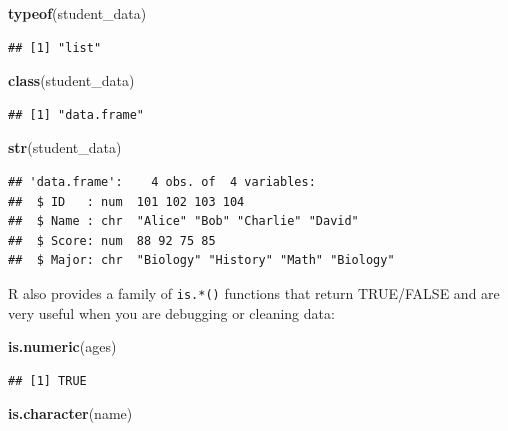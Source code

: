 \documentclass[
  11pt,
]{article}
\newenvironment{Shaded}{\begin{snugshade}}{\end{snugshade}}
\newcommand{\FunctionTok}[1]{\textcolor[rgb]{0.13,0.29,0.53}{\textbf{#1}}}
\newcommand{\NormalTok}[1]{#1}
\begin{document}
\begin{Shaded}
\begin{Highlighting}[]
\FunctionTok{typeof}\NormalTok{(student\_data)}
\end{Highlighting}
\end{Shaded}

\begin{verbatim}
## [1] "list"
\end{verbatim}

\begin{Shaded}
\begin{Highlighting}[]
\FunctionTok{class}\NormalTok{(student\_data)}
\end{Highlighting}
\end{Shaded}

\begin{verbatim}
## [1] "data.frame"
\end{verbatim}

\begin{Shaded}
\begin{Highlighting}[]
\FunctionTok{str}\NormalTok{(student\_data)}
\end{Highlighting}
\end{Shaded}

\begin{verbatim}
## 'data.frame':    4 obs. of  4 variables:
##  $ ID   : num  101 102 103 104
##  $ Name : chr  "Alice" "Bob" "Charlie" "David"
##  $ Score: num  88 92 75 85
##  $ Major: chr  "Biology" "History" "Math" "Biology"
\end{verbatim}

R also provides a family of \texttt{is.*()} functions that return
TRUE/FALSE and are very useful when you are debugging or cleaning data:

\begin{Shaded}
\begin{Highlighting}[]
\FunctionTok{is.numeric}\NormalTok{(ages)}
\end{Highlighting}
\end{Shaded}

\begin{verbatim}
## [1] TRUE
\end{verbatim}

\begin{Shaded}
\begin{Highlighting}[]
\FunctionTok{is.character}\NormalTok{(name)}
\end{Highlighting}
\end{Shaded}
\end{document}
